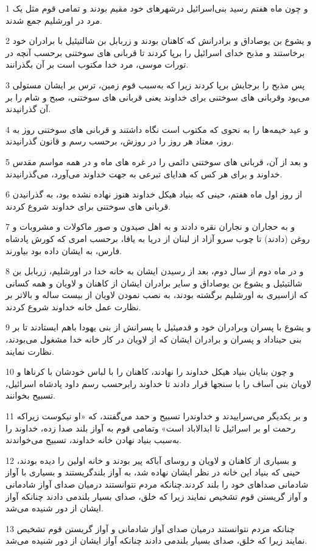 \par 1 و چون ماه هفتم رسید بنی‌اسرائیل درشهرهای خود مقیم بودند و تمامی قوم مثل یک مرد در اورشلیم جمع شدند.
\par 2 و یشوع بن یوصاداق و برادرانش که کاهنان بودند و زربابل بن شالتیئیل با برادران خود برخاستند و مذبح خدای اسرائیل را برپا کردند تا قربانی های سوختنی برحسب آنچه در تورات موسی، مرد خدا مکتوب است بر آن بگذرانند.
\par 3 پس مذبح را برجایش برپا کردند زیرا که به‌سبب قوم زمین، ترس بر ایشان مستولی می‌بود وقربانی های سوختنی برای خداوند یعنی قربانی های سوختنی، صبح و شام را بر آن گذرانیدند.
\par 4 و عید خیمه‌ها را به نحوی که مکتوب است نگاه داشتند و قربانی های سوختنی روز به روز، معتاد هر روز را در روزش، برحسب رسم و قانون گذرانیدند.
\par 5 و بعد از آن، قربانی های سوختنی دائمی را در غره های ماه و در همه مواسم مقدس خداوند و برای هر کس که هدایای تبرعی به جهت خداوند می‌آورد، می‌گذرانیدند.
\par 6 از روز اول ماه هفتم، حینی که بنیاد هیکل خداوند هنوز نهاده نشده بود، به گذرانیدن قربانی های سوختنی برای خداوند شروع کردند.
\par 7 و به حجاران و نجاران نقره دادند و به اهل صیدون و صور ماکولات و مشروبات و روغن (دادند) تا چوب سرو آزاد از لبنان از دریا به یافا، برحسب امری که کورش پادشاه فارس، به ایشان داده بود بیاورند.
\par 8 و در ماه دوم از سال دوم، بعد از رسیدن ایشان به خانه خدا در اورشلیم، زربابل بن شالتیئیل و یشوع بن یوصاداق و سایر برادران ایشان از کاهنان و لاویان و همه کسانی که ازاسیری به اورشلیم برگشته بودند، به نصب نمودن لاویان از بیست ساله و بالاتر بر نظارت عمل خانه خداوند شروع کردند.
\par 9 و یشوع با پسران وبرادران خود و قدمیئیل با پسرانش از بنی یهودا باهم ایستادند تا بر بنی حیناداد و پسران و برادران ایشان که از لاویان در کار خانه خدا مشغول می‌بودند، نظارت نمایند.
\par 10 و چون بنایان بنیاد هیکل خداوند را نهادند، کاهنان را با لباس خودشان با کرناها و لاویان بنی آساف را با سنجها قرار دادند تا خداوند رابرحسب رسم داود پادشاه اسرائیل، تسبیح بخوانند.
\par 11 و بر یکدیگر می‌سراییدند و خداوندرا تسبیح و حمد می‌گفتند، که «او نیکوست زیراکه رحمت او بر اسرائیل تا ابدالاباد است» وتمامی قوم به آواز بلند صدا زده، خداوند را به‌سبب بنیاد نهادن خانه خداوند، تسبیح می‌خواندند.
\par 12 و بسیاری از کاهنان و لاویان و روسای آباکه پیر بودند و خانه اولین را دیده بودند، حینی که بنیاد این خانه در نظر ایشان نهاده شد، به آواز بلندگریستند و بسیاری با آواز شادمانی صداهای خود را بلند کردند.چنانکه مردم نتوانستند درمیان صدای آواز شادمانی و آواز گریستن قوم تشخیص نمایند زیرا که خلق، صدای بسیار بلندمی دادند چنانکه آواز ایشان از دور شنیده می‌شد.
\par 13 چنانکه مردم نتوانستند درمیان صدای آواز شادمانی و آواز گریستن قوم تشخیص نمایند زیرا که خلق، صدای بسیار بلندمی دادند چنانکه آواز ایشان از دور شنیده می‌شد.
 
